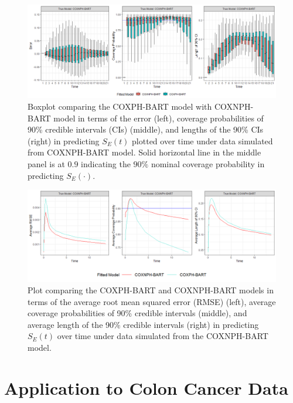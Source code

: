 \documentclass[12pt]{article}
\begin{document}
\begin{figure}
     \centering
     \includegraphics[width=\textwidth]{NPH_Boxplots.png}
     \caption{Boxplot comparing the COXPH-BART model with COXNPH-BART model in terms of the error (left),  coverage probabilities of 90\% credible intervals (CIs)  (middle), and lengths of the 90\% CIs (right) in predicting $S_E(t)$ plotted over time under data simulated from COXNPH-BART model. Solid horizontal line in the middle panel is at $0.9$ indicating the $90\%$ nominal coverage probability in predicting $S_E(\cdot).$}
     \label{fig:NPH-Boxplots}
 \end{figure}

 \begin{figure}
     \centering
     \includegraphics[width=\textwidth]{NPH-Plots.png}
     \caption{Plot comparing the COXPH-BART and COXNPH-BART models in terms of the average root mean squared error (RMSE) (left),  average coverage probabilities of 90\% credible intervals (middle), and average length of the 90\% credible intervals (right) in predicting $S_E(t)$ over time under data simulated from the COXNPH-BART model.}
     \label{fig:NPH-plots}
 \end{figure}

\section{Application to Colon Cancer Data}\label{sec:applications}
\end{document}
